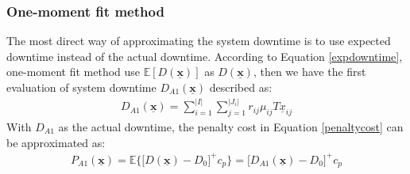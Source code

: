 \documentclass[preprint,12pt]{elsarticle}
\begin{document}
\normalsize
%
\subsubsection{One-moment fit method}

The most direct way of approximating the system downtime is to use expected downtime instead of the actual downtime. According to Equation \eqref{expdowntime}, one-moment fit method use $\mathbb{E}[D(\boldsymbol{\underline{x}})]$ as $D(\boldsymbol{\underline{x}})$, then we have the first evaluation of system downtime $D_{A1}(\boldsymbol{\underline{x}})$ described as:
\small
\begin{eqnarray}
D_{A1}(\boldsymbol{\underline{x}}) = \sum^{\lvert I \rvert}_{i=1} \sum_{j=1}^{\lvert J_{i} \rvert}{r_{ij}\mu_{ij}T\underline{x}_{ij}}
\label{approximation1}
\end{eqnarray}
\normalsize
With $D_{A1}$ as the actual downtime, the penalty cost in Equation \eqref{penaltycost} can be approximated as:
\begin{eqnarray}
P_{A1}(\boldsymbol{\underline{x}}) =\mathbb{E}\bigg\{\bigg[D(\boldsymbol{\underline{x}})-D_{0}\bigg]^{+}c_{p}\bigg\} = \bigg[D_{A1}(\boldsymbol{\underline{x}})-D_{0} \bigg]^{+}c_p \label{penapproximation1}
\end{eqnarray}
\end{document}

